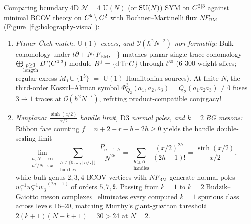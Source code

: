 \begin{theorem}[All-order finite-$N$ and nonplanar $4\mathrm{D}$ $\mathcal{N}=4$ twisted holography~{\cite{CG18,BG26,Repo9e833c8}}]
\label{thm:holography-allorder}
Comparing boundary $4\mathrm{D}$ $\mathcal{N}=4$ $\mathrm{U}(N)$ (or $\operatorname{SU}(N)$) SYM on $C^{2|3}$ against minimal BCOV theory on $C^5\setminus C^2$ with Bochner--Martinelli flux $N F_{\mathrm{BM}}$ (Figure~\ref{fig:holography-visual}):
\begin{enumerate}[label=(\arabic*),leftmargin=*]
  \item \emph{Planar \v{C}ech match, $\mathrm{U}(1)$ excess, and $\mathcal{O}(\hbar^2 N^{-2})$ non-formality:} Bulk cohomology under $t\partial + N\{F_{\mathrm{BM}},-\}$ matches planar single-trace cohomology $\bigoplus_{\substack{p\ge 1\\\mathrm{length}}}B^p(C^{2|3})$ modulo $B^1 = \{\mathrm{d}\operatorname{Tr} C\}$ through $t^{30}$ ($6{,}300$ weight slices; regular excess $M_1\cup\{1^5\}$ $=$ $\mathrm{U}(1)$ Hamiltonian sources). At finite $N$, the third-order Koszul--Akman symbol $\Phi^3_{Q_2}(a_1,a_2,a_3) = Q_2(a_1 a_2 a_3) \neq 0$ fuses $3\to 1$ traces at $\mathcal{O}(\hbar^2 N^{-2})$, refuting product-compatible conjugacy!

  \item \emph{Nonplanar $\frac{\sinh(x/2)}{x/2}$ handle limit, $\mathrm{D}3$ normal poles, and $k=2$ BG mesons:} Ribbon face counting $f = n+2-r-b-2h \ge 0$ yields the handle double-scaling limit
  \begin{equation}
  \label{eq:sinh-handle-limit}
  \lim_{\substack{n,N\to\infty\\ n^2/N\to x}}\sum_{\substack{h\in\{0,\dots,\lfloor n/2\rfloor\}\\\mathrm{handles}}}\frac{P_{n+1,h}}{N^{2h}} = \sum_{\substack{h\ge 0\\\mathrm{handles}}}\frac{(x/2)^{2h}}{(2h+1)!} = \frac{\sinh(x/2)}{x/2},
  \end{equation}
  while bulk genus-$2,3,4$ BCOV vertices with $N F_{\mathrm{BM}}$ generate normal poles $w_1^{-1}w_2^{-1}w_3^{-(2g+1)}$ of orders $5,7,9$. Passing from $k=1$ to $k=2$ Budzik--Gaiotto meson complexes~\cite{BG26} eliminates every computed $k=1$ spurious class across levels $16$--$20$, matching Murthy's giant-graviton threshold $2(k+1)(N+k+1) = 30 > 24$ at $N=2$.


\end{enumerate}
\end{theorem}
